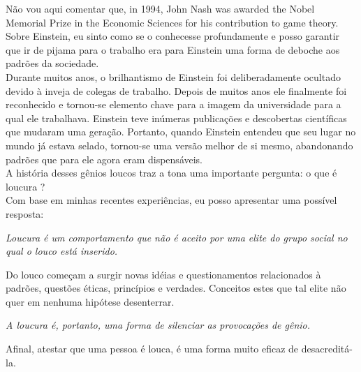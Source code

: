 \documentclass[11pt]{book}
\begin{document}
Não vou aqui comentar que, in 1994, John Nash was awarded the Nobel Memorial Prize in the Economic Sciences for his contribution to game theory. \\

Sobre Einstein, eu sinto como se o conhecesse profundamente e posso garantir que ir de pijama para o trabalho era para Einstein uma forma de deboche aos padrões da sociedade. \\

Durante muitos anos, o brilhantismo de Einstein foi deliberadamente ocultado devido à inveja de colegas de trabalho. Depois de muitos anos ele finalmente foi reconhecido e tornou-se elemento chave para a imagem da universidade para a qual ele trabalhava. Einstein teve inúmeras publicações e descobertas científicas que mudaram uma geração. Portanto, quando Einstein entendeu que seu lugar no mundo já estava selado, tornou-se uma versão melhor de si mesmo, abandonando padrões que para ele agora eram dispensáveis. \\

A história desses gênios loucos traz a tona uma importante pergunta: o que é loucura ? \\

\noindent Com base em minhas recentes experiências, eu posso apresentar uma possível resposta: \\

\noindent \begin{center} \emph{Loucura é um comportamento que não é aceito por uma elite do grupo social no qual o louco está inserido.} \end{center}

Do louco começam a surgir novas idéias e questionamentos relacionados à padrões, questões éticas, princípios e verdades. Conceitos estes que tal elite não quer em nenhuma hipótese desenterrar.

\noindent \begin{center} \emph{A loucura é, portanto, uma forma de silenciar as provocações de gênio.} \end{center}

Afinal, atestar que uma pessoa é louca, é uma forma muito eficaz de desacreditá-la.  \\
\end{document}
